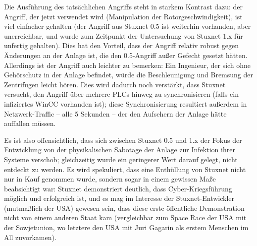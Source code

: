 \documentclass{article}
\begin{document}
Die Ausführung des tatsächlichen Angriffs steht in starkem Kontrast dazu:
der Angriff, der jetzt verwendet wird (Manipulation der Rotorgeschwindigkeit),
ist viel einfacher gehalten (der Angriff aus Stuxnet 0.5 ist weiterhin vorhanden, aber unerreichbar, und wurde zum Zeitpunkt der Untersuchung von Stuxnet 1.x für unfertig gehalten\cite{dossier}).
Dies hat den Vorteil, dass der Angriff relativ robust gegen Änderungen an der Anlage ist, die den 0.5-Angriff außer Gefecht gesetzt hätten.
Allerdings ist der Angriff auch leichter zu bemerken:
Ein Ingenieur, der sich ohne Gehörschutz in der Anlage befindet, würde die Beschleunigung und Bremsung der Zentrifugen leicht hören.
Dies wird dadurch noch verstärkt, dass Stuxnet versucht, den Angriff über mehrere PLCs hinweg zu synchronisieren
(falls ein infiziertes WinCC vorhanden ist);
diese Synchronisierung resultiert außerdem in Netzwerk-Traffic – alle 5 Sekunden – der den Aufsehern der Anlage hätte auffallen müssen.

Es ist also offensichtlich, dass sich zwischen Stuxnet 0.5 und 1.x der Fokus der Entwicklung
von der physikalischen Sabotage der Anlage zur Infektion ihrer Systeme verschob;
gleichzeitig wurde ein geringerer Wert darauf gelegt, nicht entdeckt zu werden.
Es wird spekuliert, dass eine Enthüllung von Stuxnet nicht nur in Kauf genommen wurde,
sondern sogar in einem gewissen Maße beabsichtigt war:
Stuxnet demonstriert deutlich, dass Cyber-Kriegsführung möglich und erfolgreich ist,
und es mag im Interesse der Stuxnet-Entwickler (mutmaßlich der USA) gewesen sein,
dass diese erste öffentliche Demonstration nicht von einem anderen Staat kam
(vergleichbar zum Space Race der USA mit der Sowjetunion,
wo letztere den USA mit Juri Gagarin als erstem Menschen im All zuvorkamen). %



\end{document}
